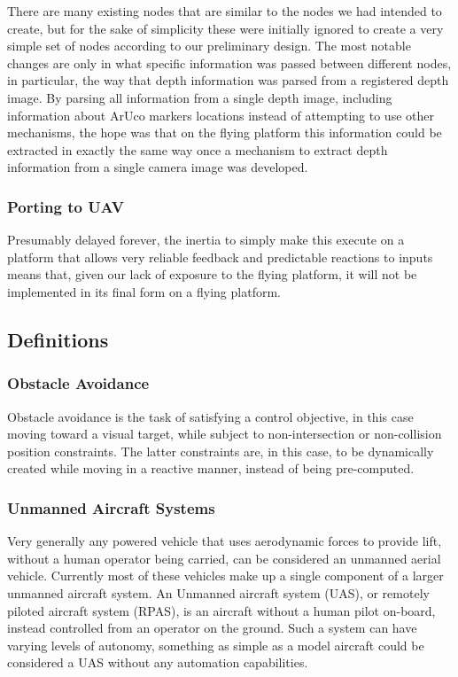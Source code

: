 \documentclass{article}[12]
\begin{document}
	There are many existing nodes that are similar to the nodes we had intended to create, but for the sake of simplicity these were initially ignored to create a very simple set of nodes according to our preliminary design. The most notable changes are only in what specific information was passed between different nodes, in particular, the way that depth information was parsed from a registered depth image. By parsing all information from a single depth image, including information about ArUco markers locations instead of attempting to use other mechanisms, the hope was that on the flying platform this information could be extracted in exactly the same way once a mechanism to extract depth information from a single camera image was developed.
	
	\subsubsection{Porting to UAV}
	
	Presumably delayed forever, the inertia to simply make this execute on a platform that allows very reliable feedback and predictable reactions to inputs means that, given our lack of exposure to the flying platform, it will not be implemented in its final form on a flying platform. 

	\subsection{Definitions}
	
		\subsubsection{Obstacle Avoidance}
		
		Obstacle avoidance is the task of satisfying a control objective, in this case moving toward a visual target, while subject to non-intersection or non-collision position constraints. The latter constraints are, in this case, to be dynamically created while moving in a reactive manner, instead of being pre-computed.
		
		\subsubsection{Unmanned Aircraft Systems}
		
		Very generally any powered vehicle that uses aerodynamic forces to provide lift, without a human operator being carried, can be considered an unmanned aerial vehicle. Currently most of these vehicles make up a single component of a larger unmanned aircraft system. An Unmanned aircraft system (UAS), or remotely piloted aircraft system (RPAS), is an aircraft without a human pilot on-board, instead controlled from an operator on the ground. Such a system can have varying levels of autonomy, something as simple as a model aircraft could be considered a UAS without any automation capabilities.\cite{RPAS}
		
\end{document}
